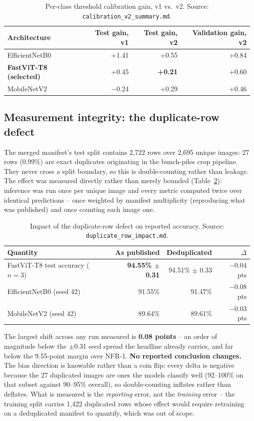 \documentclass{article}
\begin{document}
\begin{table}[t]
\centering
\caption{Per-class threshold calibration gain, v1 vs.\ v2. Source: \texttt{calibration\_v2\_summary.md}.}
\label{tab:calibration}
\begin{tabular}{@{}lrrr@{}}
\toprule
Architecture & Test gain, v1 & Test gain, v2 & Validation gain, v2 \\
\midrule
EfficientNetB0 & +1.41 & +0.55 & +0.84 \\
\textbf{FastViT-T8 (selected)} & +0.45 & \textbf{+0.21} & +0.60 \\
MobileNetV2 & $-$0.24 & +0.29 & +0.46 \\
\bottomrule
\end{tabular}
\end{table}

\subsection{Measurement integrity: the duplicate-row defect}

The merged manifest's test split contains 2{,}722 rows over 2{,}695 unique images: 27 rows (0.99\%) are
exact duplicates originating in the bunch-piles crop pipeline. They never cross a split boundary, so this
is double-counting rather than leakage. The effect was measured directly rather than merely bounded
(Table~\ref{tab:duplicates}): inference was run once per unique image and every metric computed twice over
identical predictions -- once weighted by manifest multiplicity (reproducing what was published) and once
counting each image one.

\begin{table}[t]
\centering
\caption{Impact of the duplicate-row defect on reported accuracy. Source: \texttt{duplicate\_row\_impact.md}.}
\label{tab:duplicates}
\begin{tabular}{@{}lrrr@{}}
\toprule
Quantity & As published & Deduplicated & $\Delta$ \\
\midrule
FastViT-T8 test accuracy ($n{=}3$) & \textbf{94.55\% $\pm$ 0.31} & 94.51\% $\pm$ 0.33 & $-$0.04 pts \\
EfficientNetB0 (seed 42) & 91.55\% & 91.47\% & $-$0.08 pts \\
MobileNetV2 (seed 42) & 89.64\% & 89.61\% & $-$0.03 pts \\
\bottomrule
\end{tabular}
\end{table}

The largest shift across any run measured is \textbf{0.08 points} -- an order of magnitude below the
$\pm$0.31 seed spread the headline already carries, and far below the 9.55-point margin over NFR-1.
\textbf{No reported conclusion changes.} The bias direction is knowable rather than a coin flip: every
delta is negative because the 27 duplicated images are ones the models classify well (92--100\% on that
subset against 90--95\% overall), so double-counting inflates rather than deflates. What is measured is
the \textit{reporting} error, not the \textit{training} error -- the training split carries 1{,}422
duplicated rows whose effect would require retraining on a deduplicated manifest to quantify, which was
out of scope.
\end{document}
